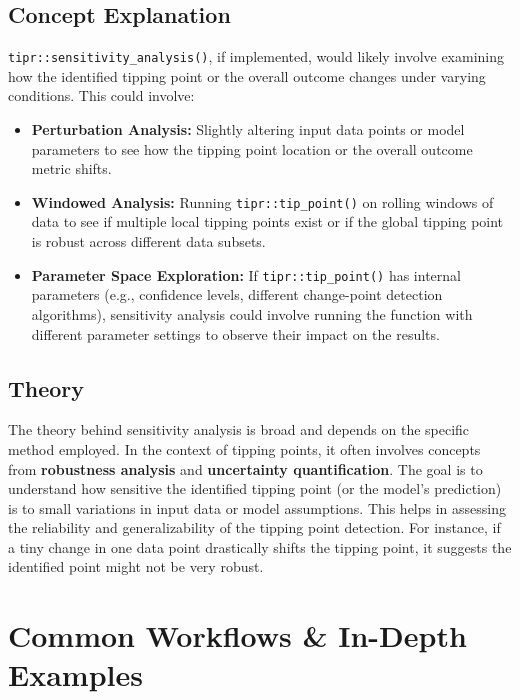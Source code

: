 \documentclass[
  10pt,
  letterpaper,
  DIV=11,
  numbers=noendperiod]{scrartcl}
\providecommand{\tightlist}{%
  \setlength{\itemsep}{0pt}\setlength{\parskip}{0pt}}
\begin{document}
\subsection{Concept Explanation}\label{concept-explanation-2}

\texttt{tipr::sensitivity\_analysis()}, if implemented, would likely
involve examining how the identified tipping point or the overall
outcome changes under varying conditions. This could involve:

\begin{itemize}
\tightlist
\item
  \textbf{Perturbation Analysis:} Slightly altering input data points or
  model parameters to see how the tipping point location or the overall
  outcome metric shifts.
\item
  \textbf{Windowed Analysis:} Running \texttt{tipr::tip\_point()} on
  rolling windows of data to see if multiple local tipping points exist
  or if the global tipping point is robust across different data
  subsets.
\item
  \textbf{Parameter Space Exploration:} If \texttt{tipr::tip\_point()}
  has internal parameters (e.g., confidence levels, different
  change-point detection algorithms), sensitivity analysis could involve
  running the function with different parameter settings to observe
  their impact on the results.
\end{itemize}

\subsection{Theory}\label{theory-2}

The theory behind sensitivity analysis is broad and depends on the
specific method employed. In the context of tipping points, it often
involves concepts from \textbf{robustness analysis} and
\textbf{uncertainty quantification}. The goal is to understand how
sensitive the identified tipping point (or the model's prediction) is to
small variations in input data or model assumptions. This helps in
assessing the reliability and generalizability of the tipping point
detection. For instance, if a tiny change in one data point drastically
shifts the tipping point, it suggests the identified point might not be
very robust.

\section{Common Workflows \& In-Depth
Examples}\label{common-workflows-in-depth-examples}
\end{document}
